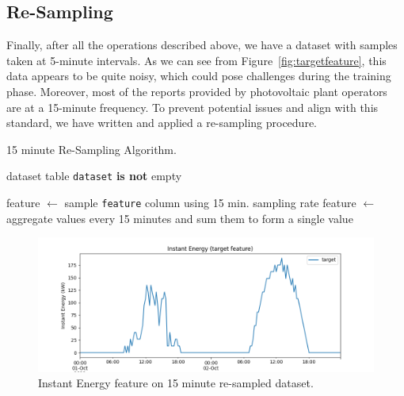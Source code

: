 \subsection{Re-Sampling}
Finally, after all the operations described above, we have a dataset
with samples taken at 5-minute intervals. As we can see from
Figure~\ref{fig:targetfeature}, this data appears to be quite noisy,
which could pose
challenges during the training phase. Moreover, most of the reports
provided by photovoltaic plant operators are at a 15-minute frequency.
To prevent potential issues and align with this standard, we have
written and applied a re-sampling procedure.

%

\begin{algorithm}[H]
	\caption{15 minute Re-Sampling Algorithm.}\label{alg:resampling}
	\begin{algorithmic}
		\Require dataset table
		\Ensure \texttt{dataset} \textbf{is not} empty

		\State feature $\gets$ sample \texttt{feature} column using 15 min. sampling rate
		\Else
		\State feature $\gets$ aggregate values every 15 minutes and sum them to form a single value
		\EndIf
		\EndFor
	\end{algorithmic}
\end{algorithm}

\begin{figure}[H]
	\centering
	\includegraphics[width=\linewidth, keepaspectratio]{chapters/2_data_preprocessing/imgs/targetfeature15min.png}
	\caption{Instant Energy feature on 15 minute re-sampled dataset.}\label{fig:15min}
\end{figure}

